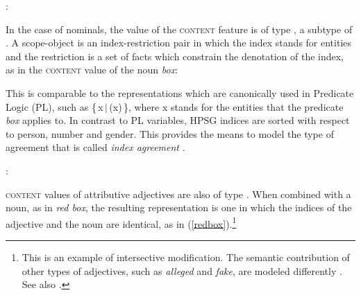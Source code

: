 \documentclass[output=paper,biblatex,babelshorthands,newtxmath,draftmode,colorlinks,citecolor=brown]{langscibook}
\begin{document}
\begin{exe} 
\ex\label{local}  :  
\end{exe} 

\noindent 
In the case of nominals, the value of the \textsc{content} feature is of 
type , a subtype of  \citep[122]{GS00}. 
A scope-object is an index-restriction pair in which the index stands for 
entities and the restriction is a set of facts which constrain the 
denotation of the index, as in the \textsc{content} value of the noun \emph{box}:    

\ea\label{red} 
\z

\noindent
This is comparable to the representations which are canonically used in 
Predicate Logic (PL), such as \{\,x\,$|$\,(x)\,\}, where x stands for 
the entities that the predicate \emph{box} applies to. In contrast to 
PL variables, HPSG indices are sorted with respect to person, number 
and gender. This provides the means to model the type of agreement that 
is called \emph{index agreement} .

\begin{exe} 
\ex  {}:  
\end{exe} 

\textsc{content} values of attributive adjectives are also of type . 
When combined with a noun, as in \emph{red box}, the resulting representation 
is one in which the indices of the adjective and the noun are identical, as in 
(\ref{redbox}).\footnote{This is an example of intersective modification. 
The semantic contribution of other types of adjectives, such as  
\emph{alleged} and \emph{fake}, are modeled differently \citep[330--331]{ps2}. See also
.}   

\begin{exe} 
\ex\label{redbox} 
\end{exe}
\end{document}
